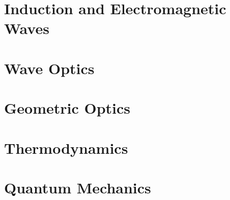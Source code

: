\documentclass[english,twoside]{labmanual} %
\begin{document}
	


	
	


\part{Induction and Electromagnetic Waves}






\part{Wave Optics}



	
	

\part{Geometric Optics}

	
	

\part{Thermodynamics}

	
	
	
	
	



	

	
	

\part{Quantum Mechanics}
\end{document}
